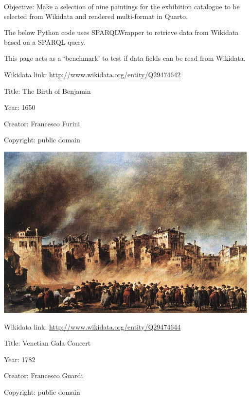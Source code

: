 \documentclass[
  letterpaper,
]{book}
\begin{document}
Objective: Make a selection of nine paintings for the exhibition
catalogue to be selected from Wikidata and rendered multi-format in
Quarto.

The below Python code uses SPARQLWrapper to retrieve data from Wikidata
based on a SPARQL query.

This page acts as a `benchmark' to test if data fields can be read from
Wikidata.

Wikidata link: \url{http://www.wikidata.org/entity/Q29474642}

Title: The Birth of Benjamin

Year: 1650

Creator: Francesco Furini

Copyright: public domain

\includegraphics{painting-collection_files/figure-pdf/cell-2-output-2.png}

Wikidata link: \url{http://www.wikidata.org/entity/Q29474644}

Title: Venetian Gala Concert

Year: 1782

Creator: Francesco Guardi

Copyright: public domain
\end{document}
